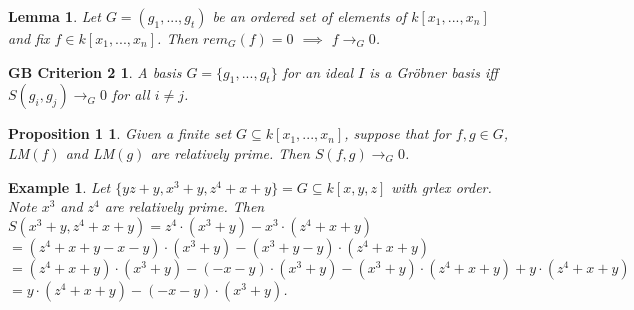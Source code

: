 \documentclass{beamer}
\newtheorem{prop1}{Proposition 1}
\newtheorem{lem}{Lemma}
\newtheorem{ex}{Example}
\newtheorem{gbc2}{GB Criterion 2}
\begin{document}

\begin{frame}

\begin{lem}
Let $G = (g_1,...,g_t)$ be an ordered set of elements of $k[x_1,...,x_n]$ and fix $f\in k[x_1,...,x_n]$. Then $rem_G(f)=0$ $\implies$ $f\rightarrow_G 0$. 
\end{lem}
\pause

\begin{gbc2}
A basis $G = \{g_1, ..., g_t\}$ for an ideal $I$ is a Gr{\"o}bner basis iff $S(g_i,g_j)\rightarrow_G 0$ for all $i\neq j$.
\end{gbc2}
\pause

\begin{prop1}
Given a finite set $G\subseteq k[x_1,...,x_n]$, suppose that for $f,g\in G$, LM$(f)$ and LM$(g)$ are relatively prime. Then $S(f,g) \rightarrow_G 0$.
\end{prop1}

\end{frame}




\begin{frame}




\begin{ex}
Let $\{yz+y, x^3+y, z^4+x+y\} = G\subseteq k[x,y,z]$ with grlex order. Note $x^3$ and $z^4$ are relatively prime. Then 
\\$S(x^3+y, z^4+x+y) =  z^4\cdot (x^3+y) - x^3\cdot (z^4+x+y)$
\\$= (z^4+x+y-x-y)\cdot (x^3+y) - (x^3+y - y)\cdot (z^4+x+y)$
\\$= (z^4+x+y)\cdot (x^3+y) - (-x-y)\cdot (x^3+y)  - (x^3+y)\cdot (z^4+x+y) + y\cdot(z^4+x+y)$
\\$= y\cdot(z^4+x+y) - (-x-y)\cdot (x^3+y)$.
\end{ex}


\end{frame}
\end{document}

